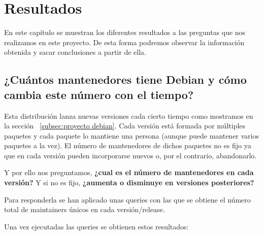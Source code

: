 \documentclass[a4paper, 12pt]{book}
\begin{document}

\cleardoublepage
\chapter{Resultados}
\label{chap:resultados}

En este capítulo se muestran los diferentes resultados a las preguntas que nos realizamos en este proyecto. De esta forma podremos observar la información obtenida y sacar conclusiones a partir de ella.

\section{¿Cuántos mantenedores tiene Debian y cómo cambia este número con el tiempo?}
\label{sec:pregunta_1}
Esta distribución lanza nuevas versiones cada cierto tiempo como mostramos en la sección ~\ref{subsec:proyecto debian}. Cada versión está formada por múltiples paquetes y cada paquete lo mantiene una persona (aunque puede mantener varios paquetes a la vez). El número de mantenedores de dichos paquetes no es fijo ya que en cada versión pueden incorporarse nuevos o, por el contrario, abandonarlo.

Y por ello nos preguntamos,  \textbf{¿cual es el número de mantenedores en cada versión?} Y si no es fijo, \textbf{¿aumenta o disminuye en versiones posteriores?}

Para responderla se han aplicado unas queries con las que se obtiene el número total de maintainers únicos en cada versión/release.

Una vez ejecutadas las queries se obtienen estos resultados:
\end{document}
